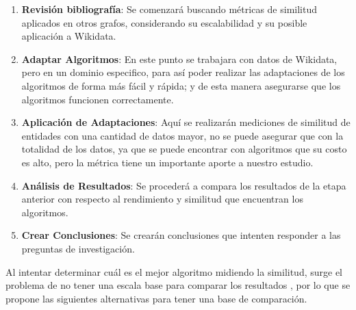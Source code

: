 \begin{enumerate}
\item \textbf{Revisión bibliografía}: Se comenzará buscando métricas de similitud aplicados en otros grafos, considerando su escalabilidad y su posible aplicación a Wikidata. 

\item \textbf{Adaptar Algoritmos}:  En este punto se trabajara con datos de Wikidata, pero en un dominio especifico, para así poder realizar las adaptaciones de los algoritmos de forma más fácil y rápida; y de esta manera asegurarse que los algoritmos funcionen correctamente.
 

\item  \textbf{Aplicación de Adaptaciones}:  Aquí se realizarán mediciones de similitud de entidades con una cantidad de datos mayor, no se puede asegurar que con la totalidad de los datos, ya que se puede encontrar con algoritmos que su costo es alto, pero la métrica tiene un importante aporte a nuestro estudio.

\item \textbf{Análisis de Resultados}: Se procederá a compara los resultados de la etapa anterior con respecto al rendimiento y similitud que encuentran los algoritmos. 

\item \textbf{Crear Conclusiones}: Se crearán conclusiones que intenten responder a las preguntas de investigación. 
\end{enumerate}
\newpage
Al intentar determinar  cuál es el mejor algoritmo midiendo la similitud, surge el problema de  no tener una escala base para comparar los resultados \cite{leicht2006vertex}, por lo que se propone las siguientes alternativas para tener una base de comparación.

